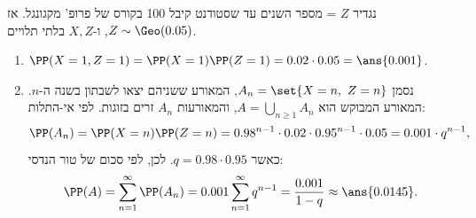 \begin{enumerate}
\begin{solbox}
\unverified
נגדיר $Z$ = מספר השנים עד שסטודנט קיבל 100 בקורס של פרופ' מקגונגל. אז $Z\sim\Geo(0.05)$, ו-$X,Z$ בלתי תלויים.
\begin{enumerate}
\item $\PP(X=1,Z=1)=\PP(X=1)\PP(Z=1)=0.02\cdot0.05=\ans{0.001}$.
\item נסמן $A_n=\set{X=n,\ Z=n}$, המאורע ששניהם יצאו לשבתון בשנה ה-$n$. המאורע המבוקש הוא $A=\bigcup_{n\ge1}A_n$, והמאורעות $A_n$ זרים בזוגות. לפי אי-התלות:
\[
\PP(A_n)=\PP(X=n)\PP(Z=n)=0.98^{n-1}\cdot0.02\cdot0.95^{n-1}\cdot0.05=0.001\cdot q^{n-1},
\]
כאשר $q=0.98\cdot0.95$. לכן, לפי סכום של טור הנדסי:
\[
\PP(A)=\sum_{n=1}^\infty\PP(A_n)=0.001\sum_{n=1}^\infty q^{n-1}=\frac{0.001}{1-q}\approx\ans{0.0145}.
\]

\end{enumerate}
\end{solbox}
\end{enumerate}
